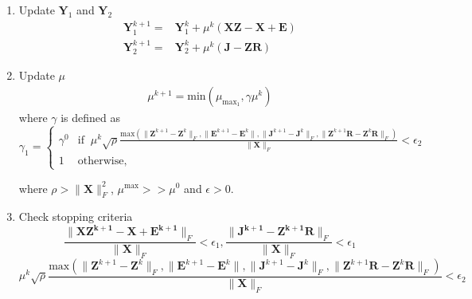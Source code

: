 \documentclass{article}
\begin{document}
\begin{enumerate}
\item Update $\mathbf Y_1$ and $\mathbf Y_2$
\begin{align*}
\mathbf Y^{k+1}_1 =& \mathbf Y^k_1 + \mu^k (\mathbf{XZ - X + E})\\
\mathbf Y^{k+1}_2 =& \mathbf Y^k_2 + \mu^k (\mathbf{J - ZR})
\end{align*}

\item Update $\mu$
\begin{align*}
 \mu^{k+1} = \textrm{min}( \mu_{\text{max}_1}, \gamma \mu^k)
\end{align*}
where $\gamma$ is defined as
\[
\gamma_1 = 
\begin{cases}
\gamma^0 & \text{if} \;\; \mu^k \sqrt{\rho} \frac{ \textrm{max} ( \| \mathbf Z^{k+1} - \mathbf Z^{k}  \|_F  , \|  \mathbf E^{k+1} - \mathbf E^{k} \|, \| \mathbf J^{k+1} - \mathbf J^{k}  \|_F  , \|  \mathbf Z^{k+1} \mathbf R - \mathbf Z^{k} \mathbf R \|_F)}{\| \mathbf X \|_F}  < \epsilon_2 \\
1 & \text{otherwise,}
\end{cases}
\]

where $\rho > \|\mathbf X\|_F^2$, $\mu^{\text{max}} >>  \mu^0$ and $\epsilon > 0$.

\item Check stopping criteria
\[
\frac{\|\mathbf{XZ^{k+1} - X + E^{k+1}} \|_F}{\| \mathbf X \|_F} < \epsilon_1, \frac{\|\mathbf{J^{k+1} - Z^{k+1}R}\|_F}{\| \mathbf X \|_F} < \epsilon_1
\]
\[
\mu^k \sqrt{\rho} \frac{ \textrm{max} ( \| \mathbf Z^{k+1} - \mathbf Z^{k}  \|_F  , \|  \mathbf E^{k+1} - \mathbf E^{k} \|, \| \mathbf J^{k+1} - \mathbf J^{k}  \|_F  , \|  \mathbf Z^{k+1} \mathbf R - \mathbf Z^{k} \mathbf R \|_F)}{\| \mathbf X \|_F}  < \epsilon_2
\]

\end{enumerate}



\newpage


\end{document}
